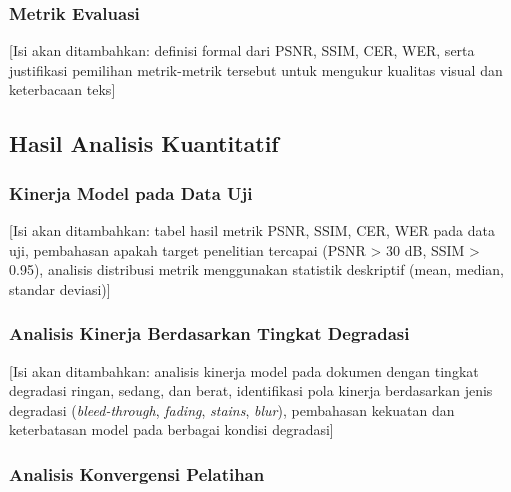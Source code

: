 \documentclass[12pt,a4paper]{article}
\begin{document}
\vspace{0.8em}

\subsubsection{Metrik Evaluasi}
\label{subsubsec:metrik-evaluasi}

[Isi akan ditambahkan: definisi formal dari PSNR, SSIM, CER, WER, serta justifikasi pemilihan metrik-metrik tersebut untuk mengukur kualitas visual dan keterbacaan teks]

\vspace{0.8em}

\subsection{Hasil Analisis Kuantitatif}
\label{subsec:hasil-kuantitatif}
\vspace{0.8em}

\subsubsection{Kinerja Model pada Data Uji}
\label{subsubsec:kinerja-model}

[Isi akan ditambahkan: tabel hasil metrik PSNR, SSIM, CER, WER pada data uji, pembahasan apakah target penelitian tercapai (PSNR > 30 dB, SSIM > 0.95), analisis distribusi metrik menggunakan statistik deskriptif (mean, median, standar deviasi)]

\vspace{0.8em}

\subsubsection{Analisis Kinerja Berdasarkan Tingkat Degradasi}
\label{subsubsec:kinerja-degradasi}

[Isi akan ditambahkan: analisis kinerja model pada dokumen dengan tingkat degradasi ringan, sedang, dan berat, identifikasi pola kinerja berdasarkan jenis degradasi (\textit{bleed-through}, \textit{fading}, \textit{stains}, \textit{blur}), pembahasan kekuatan dan keterbatasan model pada berbagai kondisi degradasi]

\vspace{0.8em}

\subsubsection{Analisis Konvergensi Pelatihan}
\label{subsubsec:konvergensi-pelatihan}
\end{document}
